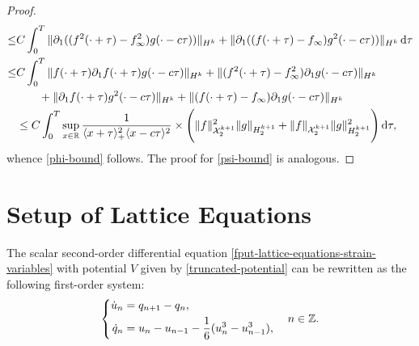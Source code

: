 \begin{proof}
\begin{align*}
		\leq& C \int_0^T \| \partial_1 ((f^2(\cdot+\tau)-f_\infty^2)g(\cdot-c\tau)) \|_{H^k} + \| \partial_1( (f(\cdot+\tau)-f_\infty)g^2(\cdot-c\tau)) \|_{H^k} \, \mathrm d \tau \\
		\leq& C \int_0^T \| f(\cdot+\tau)\partial_1 f(\cdot + \tau)g(\cdot-c\tau) \|_{H^k} + \|(f^2(\cdot+\tau) -f_\infty^2) \partial_1 g(\cdot - c\tau) \|_{H^k}  \\
		&\qquad + \|\partial_1f(\cdot+\tau) g^2(\cdot - c\tau) \|_{H^k} + \| (f(\cdot + \tau) -f_\infty) \partial_1 g(\cdot - c\tau) \|_{H^k} \\ 
		&\leq C \int_0^T \sup_{x\in\mathbb{R}} \frac 1 {\langle x + \tau\rangle_+^2 \langle x - c\tau\rangle^2} \times \Bigg( \|f\|^2_{\mathcal X^{k+1}_{2}} \| g \|_{H^{k+1}_2} + \|f\|_{\mathcal X^{k+1}_{2}} \| g \|^2_{H^{k+1}_2} \Bigg) \, \mathrm d \tau, 
	\end{align*} 
	whence \cref{phi-bound} follows. The proof for \cref{psi-bound} is analogous.
\end{proof}

\section{Setup of Lattice Equations}

The scalar second-order differential equation \cref{fput-lattice-equations-strain-variables} with potential \(V\) given by \cref{truncated-potential} can be rewritten as the following first-order system:
\begin{equation}\label{first-order-lattice-eqns}
	\left\{\begin{aligned}\dot u _n &= q_{n+1} - q_n, \\
	\dot q_n &= u_n - u_{n-1} - \frac{1} 6 ( u_n^3 - u^3_{n-1}),\end{aligned} \right. \quad n \in \mathbb{Z}.
\end{equation}






